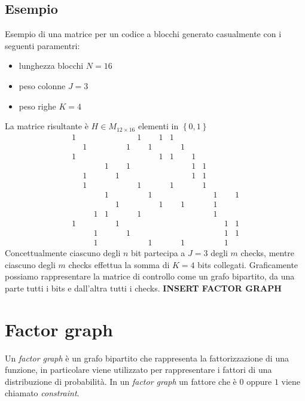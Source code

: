 \documentclass{article}
\begin{document}
	\subsection{Esempio}
	Esempio di una matrice per un codice a blocchi generato casualmente con i seguenti paramentri:
	\begin{itemize}
		\item lunghezza blocchi $N = 16$
		\item peso colonne $J  = 3$
		\item peso righe $K = 4$
	\end {itemize}
	La matrice risultante è $H \in M_{12 \times 16}$ elementi in $\left\{0,1\right\}$
	\begin{equation*}
		\begin{smallmatrix}
			1& & & & & &1& &1&1& & & & & &  \\
			 &1& & & &1& &1& & &1& & & & &  \\
			1& & & & & & & &1&1& &1& & & &  \\
			 & & &1& &1& & & & & &1&1& & &  \\
			 &1& & &1& & & & & & &1&1& & &  \\
			 &1& & & & &1& & &1& & &1& & &  \\
			 & & &1& & & &1& & & & & &1& &1 \\
			 & & & &1& & & &1& &1& & &1& &  \\
			 & &1&1& & &1& & & & & & &1& &  \\
			1& & & &1& & & & & & & & & &1&1 \\
			 & &1& & &1& & & & & & & & &1&1 \\
			 & &1& & & & &1& & &1& & & &1& 
		\end{smallmatrix}
	\end{equation*}
	Concettualmente ciascuno degli $n$ bit partecipa a $J = 3$ degli $m$ checks, mentre ciascuno degli $m$ checks effettua la somma di $K = 4$ bits collegati.
	Graficamente possiamo rappresentare la matrice di controllo come un grafo bipartito, da una parte tutti i bits e dall'altra tutti i checks.
	\textbf{INSERT FACTOR GRAPH}
	
	
	\section{Factor graph}
		Un \textit{factor graph} è un grafo bipartito che rappresenta la fattorizzazione di una funzione, in particolare viene utilizzato per rappresentare i fattori di una distribuzione di probabilità. In un \textit{factor graph} un fattore che è $0$ oppure $1$ viene chiamato \textit{constraint}.
\end{document}
